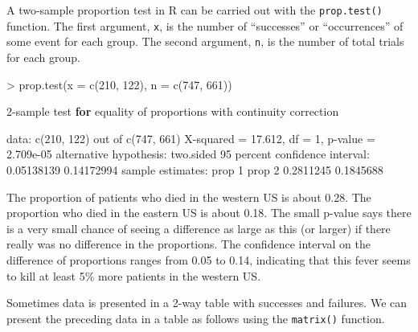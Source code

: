 \documentclass[
]{book}
\newenvironment{Shaded}{\begin{snugshade}}{\end{snugshade}}
\newcommand{\AttributeTok}[1]{\textcolor[rgb]{0.77,0.63,0.00}{#1}}
\newcommand{\ControlFlowTok}[1]{\textcolor[rgb]{0.13,0.29,0.53}{\textbf{#1}}}
\newcommand{\DecValTok}[1]{\textcolor[rgb]{0.00,0.00,0.81}{#1}}
\newcommand{\FloatTok}[1]{\textcolor[rgb]{0.00,0.00,0.81}{#1}}
\newcommand{\FunctionTok}[1]{\textcolor[rgb]{0.00,0.00,0.00}{#1}}
\newcommand{\NormalTok}[1]{#1}
\newcommand{\OtherTok}[1]{\textcolor[rgb]{0.56,0.35,0.01}{#1}}
\newcommand{\SpecialCharTok}[1]{\textcolor[rgb]{0.00,0.00,0.00}{#1}}
\begin{document}
A two-sample proportion test in R can be carried out with the \texttt{prop.test()} function. The first argument, \texttt{x}, is the number of ``successes'' or ``occurrences'' of some event for each group. The second argument, \texttt{n}, is the number of total trials for each group.

\begin{Shaded}
\begin{Highlighting}[]
\SpecialCharTok{\textgreater{}} \FunctionTok{prop.test}\NormalTok{(}\AttributeTok{x =} \FunctionTok{c}\NormalTok{(}\DecValTok{210}\NormalTok{, }\DecValTok{122}\NormalTok{), }\AttributeTok{n =} \FunctionTok{c}\NormalTok{(}\DecValTok{747}\NormalTok{, }\DecValTok{661}\NormalTok{))}

    \DecValTok{2}\SpecialCharTok{{-}}\NormalTok{sample test }\ControlFlowTok{for}\NormalTok{ equality of proportions with continuity correction}

\NormalTok{data}\SpecialCharTok{:}  \FunctionTok{c}\NormalTok{(}\DecValTok{210}\NormalTok{, }\DecValTok{122}\NormalTok{) out of }\FunctionTok{c}\NormalTok{(}\DecValTok{747}\NormalTok{, }\DecValTok{661}\NormalTok{)}
\NormalTok{X}\SpecialCharTok{{-}}\NormalTok{squared }\OtherTok{=} \FloatTok{17.612}\NormalTok{, df }\OtherTok{=} \DecValTok{1}\NormalTok{, p}\SpecialCharTok{{-}}\NormalTok{value }\OtherTok{=} \FloatTok{2.709e{-}05}
\NormalTok{alternative hypothesis}\SpecialCharTok{:}\NormalTok{ two.sided}
\DecValTok{95}\NormalTok{ percent confidence interval}\SpecialCharTok{:}
 \FloatTok{0.05138139} \FloatTok{0.14172994}
\NormalTok{sample estimates}\SpecialCharTok{:}
\NormalTok{   prop }\DecValTok{1}\NormalTok{    prop }\DecValTok{2} 
\FloatTok{0.2811245} \FloatTok{0.1845688} 
\end{Highlighting}
\end{Shaded}

The proportion of patients who died in the western US is about 0.28. The proportion who died in the eastern US is about 0.18. The small p-value says there is a very small chance of seeing a difference as large as this (or larger) if there really was no difference in the proportions. The confidence interval on the difference of proportions ranges from 0.05 to 0.14, indicating that this fever seems to kill at least 5\% more patients in the western US.

Sometimes data is presented in a 2-way table with successes and failures. We can present the preceding data in a table as follows using the \texttt{matrix()} function.
\end{document}
